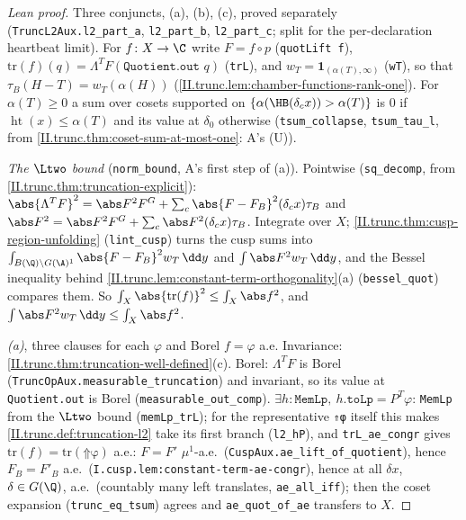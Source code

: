 \begin{proof}[Lean proof]
Three conjuncts, (a), (b), (c), proved separately (\texttt{TruncL2Aux.l2\_part\_a}, \texttt{l2\_part\_b}, \texttt{l2\_part\_c}; split for the per-declaration heartbeat limit). For $f\colon X\to\C$ write $F=f\circ p$ (\texttt{quotLift f}), $\mathrm{tr}(f)(q)=\Lambda^TF(\texttt{Quotient.out }q)$ (\texttt{trL}), and $w_T=\mathbf 1_{(\alpha(T),\infty)}$ (\texttt{wT}), so that $\tau_B(H-T)=w_T(\alpha(H))$ (\cref{II.trunc.lem:chamber-functions-rank-one}). For $\alpha(T)\ge0$ a sum over cosets supported on $\{\alpha(\HB(\delta_cx))>\alpha(T)\}$ is $0$ if $\operatorname{ht}(x)\le\alpha(T)$ and its value at $\delta_0$ otherwise (\texttt{tsum\_collapse}, \texttt{tsum\_tau\_l}, from \cref{II.trunc.thm:coset-sum-at-most-one}: A's (U)).

\emph{The $\Ltwo$ bound} (\texttt{norm\_bound}, A's first step of (a)). Pointwise (\texttt{sq\_decomp}, from \cref{II.trunc.thm:truncation-explicit}): $\abs{\Lambda^TF}^2=\abs F^2F^G+\sum_c\abs{F-F_B}^2(\delta_cx)\tau_B$ and $\abs F^2=\abs F^2F^G+\sum_c\abs F^2(\delta_cx)\tau_B$. Integrate over $X$; \cref{II.trunc.thm:cusp-region-unfolding} (\texttt{lint\_cusp}) turns the cusp sums into $\int_{B(\Q)\backslash G(\A)^1}\abs{F-F_B}^2w_T\,\dd y$ and $\int\abs F^2w_T\,\dd y$, and the Bessel inequality behind \cref{II.trunc.lem:constant-term-orthogonality}(a) (\texttt{bessel\_quot}) compares them. So $\int_X\abs{\mathrm{tr}(f)}^2\le\int_X\abs f^2$, and $\int\abs F^2w_T\,\dd y\le\int_X\abs f^2$.

\emph{(a)}, three clauses for each $\varphi$ and Borel $f=\varphi$ a.e. Invariance: \cref{II.trunc.thm:truncation-well-defined}(c). Borel: $\Lambda^TF$ is Borel (\texttt{TruncOpAux.measurable\_truncation}) and invariant, so its value at \texttt{Quotient.out} is Borel (\texttt{measurable\_out\_comp}). $\exists h:\texttt{MemLp},\ h.\texttt{toLp}=P^T\varphi$: \texttt{MemLp} from the $\Ltwo$ bound (\texttt{memLp\_trL}); for the representative \texttt{⇑φ} itself this makes \cref{II.trunc.def:truncation-l2} take its first branch (\texttt{l2\_hP}), and \texttt{trL\_ae\_congr} gives $\mathrm{tr}(f)=\mathrm{tr}(\texttt{⇑φ})$ a.e.: $F=F'$ $\mu^1$-a.e.\ (\texttt{CuspAux.ae\_lift\_of\_quotient}), hence $F_B=F'_B$ a.e.\ (\texttt{I.cusp.lem:constant-term-ae-congr}), hence at all $\delta x$, $\delta\in G(\Q)$, a.e.\ (countably many left translates, \texttt{ae\_all\_iff}); then the coset expansion (\texttt{trunc\_eq\_tsum}) agrees and \texttt{ae\_quot\_of\_ae} transfers to $X$.


\end{proof}
